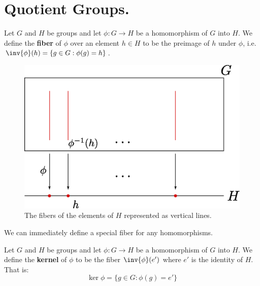 
\section{Quotient Groups.}
\label{section1}

\begin{definition}
    Let $G$ and $H$ be groups and let $\phi:G \rightarrow H$ be a homomorphism
    of $G$ into  $H$. We define the \textbf{fiber} of $\phi$ over an element $h
    \in H$ to be the preimage of  $h$ under  $\phi$, i.e.  $\inv{\phi}(h)=\{g
    \in G : \phi(g)=h\}$.
\end{definition}

\begin{figure}[h]
    \centering
    \includegraphics[scale = 0.5]{Figures/Chapter3/fibers.eps}
    \caption{The fibers of the elements of $H$ represented as vertical lines.}
    \label{fig_3.1}
\end{figure}

We can immediately define a special fiber for any homomorphisms.

\begin{definition}
    Let $G$ and  $H$ be groups and let  $\phi:G \rightarrow H$ be a homomorphism
    of $G$ into  $H$. We define the \textbf{kernel} of $\phi$ to be the fiber
    $\inv{\phi}(e')$ where $e'$ is the identity of  $H$. That is:
    \begin{equation}
        \ker{\phi}=\{g \in G : \phi(g)=e'\}
    \end{equation}
\end{definition}

